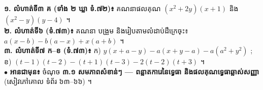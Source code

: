 \documentclass[a4paper,10pt]{article}
\begin{document}
\begin{tcolorbox}[enhanced, sharp corners, colback=white, colframe=black, boxrule=0.8pt, borderline={0.6pt}{2pt}{dashed}, top=3pt, bottom=3pt, left=6pt, right=6pt]
  \textbf{១. លំហាត់ទី៣ គ (ទាំង ២ ឃ្លា ទំ.៧២)៖} គណនាផលគុណ $(x^2 + 2y)(x + 1)$ និង $(x^2 - y)(y - 4)$ ។\\[1.5pt]
  \textbf{២. លំហាត់ទី៦ (ទំ.៧៣)៖} គណនា បង្រួម និងរៀបតាមលំដាប់ដឺក្រេចុះ៖ $a(x - b) - b(a - x) + x(a + b)$ ។\\[1.5pt]
  \textbf{៣. លំហាត់ទី៧ ក--ខ (ទំ.៧៣)៖} ក) $y(x+a-y) - a(x+y-a) - a(a^2+y^2)$ \;;\; ខ) $(t-1)(t-2) - (t+1)(t-3) - 2(t-2)(t+3)$ ។\\[1.5pt]
  $\bullet$ \textbf{អានជាមុន៖} ចំណុច \textbf{៣.១ សមភាពសំខាន់ៗ — ពន្លាតការេនៃទ្វេធា និងផលគុណទ្វេធាឆ្លាស់សញ្ញា} (សៀវភៅគោល ទំព័រ ៦៣--៦៦) ។
\end{tcolorbox}
\end{document}
